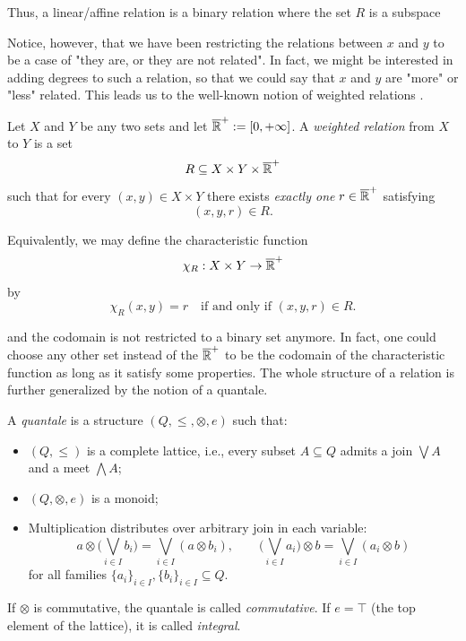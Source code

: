 Thus, a linear/affine relation is a binary relation where the set $R$ is a subspace

Notice, however, that we have been restricting the relations between $x$ and $y$ to be a case of "they are, or they are not related". In fact, we might be interested in adding degrees to such a relation, so that we could say that $x$ and $y$ are "more" or "less" related. This leads us to the well-known notion of weighted relations \cite{lawvere1973metric}.

\begin{definition}
	Let $X$ and $Y$ be any two sets and let $\overline{\mathbb{R}}^+:= [0, +\infty]$.
	A \emph{weighted relation} from $X$ to $Y$ is a set
	\[
		R \subseteq X \times Y \times \overline{\mathbb{R}}^+
	\]
	such that for every $(x,y) \in X \times Y$ there exists \emph{exactly one}
	$r \in \overline{\mathbb{R}}^+$ satisfying
	\[
		(x,y,r) \in R.
	\]

	Equivalently, we may define the characteristic function
	\[
		\chi_R : X \times Y \to \overline{\mathbb{R}}^+
	\]
	by
	\[
		\chi_R(x,y) =
		r
		\quad \text{if and only if } (x,y,r) \in R.
	\]
\end{definition}

and the codomain is not restricted to a binary set anymore.
In fact, one could choose any other set instead of the $\overline{\mathbb{R}}^+$ to be the codomain of the characteristic function as long as it satisfy some properties. The whole structure of a relation is further generalized by the notion of a quantale.
\begin{definition}[Quantale]
	A \emph{quantale} is a structure $(Q,\leq,\otimes,e)$ such that:

	\begin{itemize}
		\item $(Q,\leq)$ is a complete lattice, i.e., every subset $A \subseteq Q$ admits a join $\bigvee A$ and a meet $\bigwedge A$;
		\item $(Q,\otimes,e)$ is a monoid;
		\item Multiplication distributes over arbitrary join in each variable:
		      \[
			      a \otimes \Big( \bigvee_{i \in I} b_i \Big)
			      =
			      \bigvee_{i \in I} (a \otimes b_i),
			      \qquad
			      \Big( \bigvee_{i \in I} a_i \Big) \otimes b
			      =
			      \bigvee_{i \in I} (a_i \otimes b)
		      \]
		      for all families $\{a_i\}_{i\in I}, \{b_i\}_{i\in I} \subseteq Q$.
	\end{itemize}

	If $\otimes$ is commutative, the quantale is called \emph{commutative}.
	If $e = \top$ (the top element of the lattice), it is called \emph{integral}.
\end{definition}

